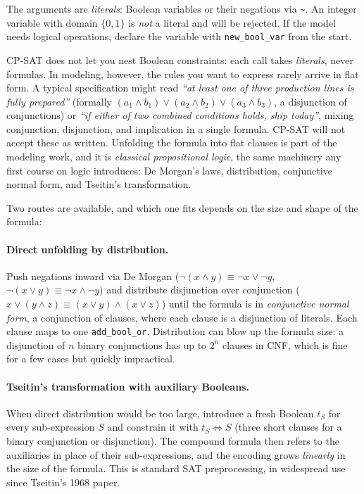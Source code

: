 The arguments are \emph{literals}: Boolean variables or their negations
via \lstinline!~!. An integer variable with domain
\(\{0, 1\}\) is \emph{not} a literal and will be rejected. If the
model needs logical operations, declare the variable with
\lstinline!new_bool_var! from the start.

CP-SAT does not let you nest Boolean constraints: each call takes
\emph{literals}, never formulas. In modeling, however, the rules you
want to express rarely arrive in flat form. A typical specification
might read \emph{``at least one of three production lines is fully
prepared''} (formally
\((a_1 \land b_1) \lor (a_2 \land b_2) \lor (a_3 \land b_3)\), a
disjunction of conjunctions) or \emph{``if either of two combined
conditions holds, ship today''}, mixing conjunction, disjunction, and
implication in a single formula. CP-SAT will not accept these as
written. Unfolding the formula into flat clauses is part of the modeling
work, and it is \emph{classical propositional logic}, the same
machinery any first course on logic introduces: De Morgan's laws,
distribution, conjunctive normal form, and Tseitin's transformation.

Two routes are available, and which one fits depends on the size and
shape of the formula:

\paragraph{Direct unfolding by distribution.} Push negations inward via De
Morgan (\(\lnot(x \land y) \equiv \lnot x \lor \lnot y\),
\(\lnot(x \lor y) \equiv \lnot x \land \lnot y\)) and distribute
disjunction over conjunction
(\(x \lor (y \land z) \equiv (x \lor y) \land (x \lor z)\)) until the
formula is in \emph{conjunctive normal form}, a conjunction of
clauses, where each clause is a disjunction of literals. Each clause
maps to one \lstinline!add_bool_or!. Distribution can
blow up the formula size: a disjunction of \(n\) binary conjunctions has
up to \(2^n\) clauses in CNF, which is fine for a few cases but quickly
impractical.

\paragraph{Tseitin's transformation with auxiliary Booleans.} When direct
distribution would be too large, introduce a fresh Boolean \(t_S\) for
every sub-expression \(S\) and constrain it with
\(t_S \Leftrightarrow S\) (three short clauses for a binary conjunction
or disjunction). The compound formula then refers to the auxiliaries in
place of their sub-expressions, and the encoding grows \emph{linearly}
in the size of the formula. This is standard SAT preprocessing, in
widespread use since Tseitin's 1968 paper.

